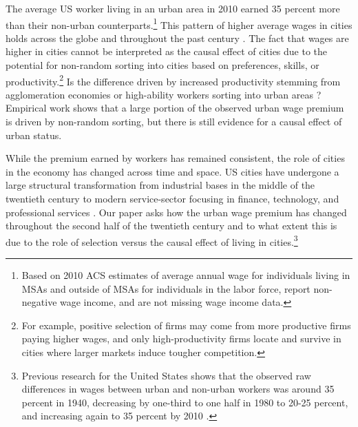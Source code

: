\documentclass[12pt]{article}
\begin{document}
The average US worker living in an urban area in 2010 earned 35 percent more than their non-urban counterparts.\footnote{
Based on 2010 ACS estimates of average annual wage for individuals living in MSAs and outside of MSAs for individuals in the labor force, report non-negative wage income, and are not missing wage income data.} 
This pattern of higher average wages in cities holds across the globe and throughout the past century \citep*{Boustan_Bunten_Hearey_2013, carlsen2016education, ahlfeldt2019economic, glaeser2022can, eliasson2023urban}.
The fact that wages are higher in cities cannot be interpreted as the causal effect of cities due to the potential for non-random sorting into cities based on preferences, skills, or productivity.\footnote{
For example, positive selection of firms may come from more productive firms paying higher wages, and only high-productivity firms locate and survive in cities where larger markets induce tougher competition.} 
Is the difference driven by increased productivity stemming from agglomeration economies or high-ability workers sorting into urban areas \citep*[e.g.][]{behrens2014productive,moretti2011handbook,puga2010magnitude}?
Empirical work shows that a large portion of the observed urban wage premium is driven by non-random sorting, but there is still evidence for a causal effect of urban status.

While the premium earned by workers has remained consistent, the role of cities in the economy has changed across time and space.
US cities have undergone a large structural transformation from industrial bases in the middle of the twentieth century to modern service-sector focusing in finance, technology, and professional services \citep*{glaeser2001consumer,glaeser2003urban,shapiro2006smart, diamond2021spatial,connor2024frontier}.
Our paper asks how the urban wage premium has changed throughout the second half of the twentieth century and to what extent this is due to the role of selection versus the causal effect of living in cities.\footnote{Previous research for the United States shows that the observed raw differences in wages between urban and non-urban workers was around 35 percent in 1940, decreasing by one-third to one half in 1980 to 20-25 percent, and increasing again to 35 percent by 2010 \citep*{Boustan_Bunten_Hearey_2013}.}
\end{document}

